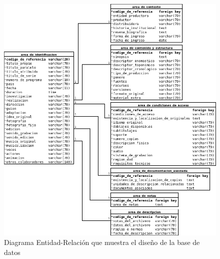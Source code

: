 \documentclass[10pt,letterpaper]{article}
\begin{document}
\begin{figure}[H]
	\centering
	\includegraphics[keepaspectratio=true,width=\linewidth]{EntidadRelacion.png}
	\caption{Diagrama Entidad-Relación que muestra el diseño de la base de datos}
	\label{fig:entidad_relacion}
\end{figure}
\end{document}
